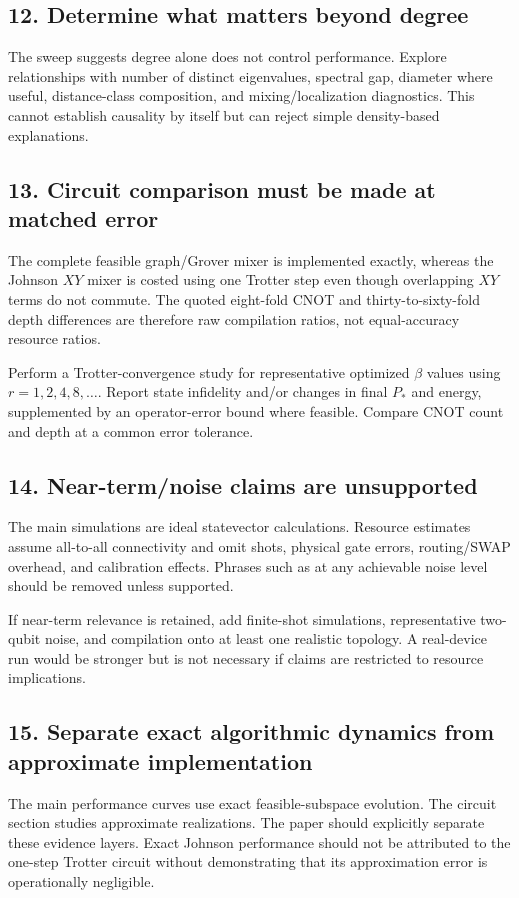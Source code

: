 \documentclass[11pt]{article}
\begin{document}
\subsection*{12. Determine what matters beyond degree}
The sweep suggests degree alone does not control performance. Explore relationships with number of distinct eigenvalues, spectral gap, diameter where useful, distance-class composition, and mixing/localization diagnostics. This cannot establish causality by itself but can reject simple density-based explanations.

\subsection*{13. Circuit comparison must be made at matched error}
The complete feasible graph/Grover mixer is implemented exactly, whereas the Johnson $XY$ mixer is costed using one Trotter step even though overlapping $XY$ terms do not commute. The quoted eight-fold CNOT and thirty-to-sixty-fold depth differences are therefore raw compilation ratios, not equal-accuracy resource ratios.

Perform a Trotter-convergence study for representative optimized $\beta$ values using $r=1,2,4,8,\ldots$. Report state infidelity and/or changes in final $P_*$ and energy, supplemented by an operator-error bound where feasible. Compare CNOT count and depth at a common error tolerance.

\subsection*{14. Near-term/noise claims are unsupported}
The main simulations are ideal statevector calculations. Resource estimates assume all-to-all connectivity and omit shots, physical gate errors, routing/SWAP overhead, and calibration effects. Phrases such as at any achievable noise level should be removed unless supported.

If near-term relevance is retained, add finite-shot simulations, representative two-qubit noise, and compilation onto at least one realistic topology. A real-device run would be stronger but is not necessary if claims are restricted to resource implications.

\subsection*{15. Separate exact algorithmic dynamics from approximate implementation}
The main performance curves use exact feasible-subspace evolution. The circuit section studies approximate realizations. The paper should explicitly separate these evidence layers. Exact Johnson performance should not be attributed to the one-step Trotter circuit without demonstrating that its approximation error is operationally negligible.
\end{document}
